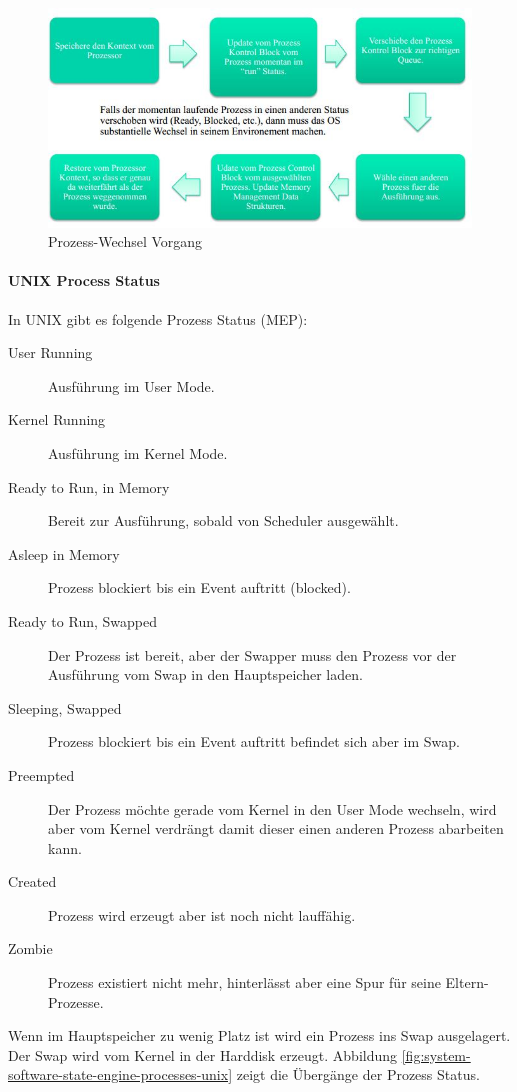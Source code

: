 \begin{figure}[h!]
	\centering
	\includegraphics[width=0.7\linewidth]{fig/system-software-prozess-wechsel}
	\caption{Prozess-Wechsel Vorgang}
	\label{fig:system-software-prozess-wechsel}
\end{figure}

\paragraph{UNIX Process Status}
In UNIX gibt es folgende Prozess Status (MEP):
\begin{description}
	\item[User Running] Ausführung im User Mode.
	\item[Kernel Running] Ausführung im Kernel Mode.
	\item[Ready to Run, in Memory] Bereit zur Ausführung, sobald von Scheduler ausgewählt.
	\item[Asleep in Memory] Prozess blockiert bis ein Event auftritt (blocked).
	\item[Ready to Run, Swapped] Der Prozess ist bereit, aber der Swapper muss den Prozess vor der Ausführung vom Swap in den Hauptspeicher laden.
	\item[Sleeping, Swapped] Prozess blockiert bis ein Event auftritt befindet sich aber im Swap.
	\item[Preempted] Der Prozess möchte gerade vom Kernel in den User Mode wechseln, wird aber vom Kernel verdrängt damit dieser einen anderen Prozess abarbeiten kann.
	\item[Created] Prozess wird erzeugt aber ist noch nicht lauffähig.
	\item[Zombie] Prozess existiert nicht mehr, hinterlässt aber eine Spur für seine Eltern-Prozesse.
\end{description}
Wenn im Hauptspeicher zu wenig Platz ist wird ein Prozess ins Swap ausgelagert. Der Swap wird vom Kernel in der Harddisk erzeugt. Abbildung \ref{fig:system-software-state-engine-processes-unix} zeigt die Übergänge der Prozess Status.

